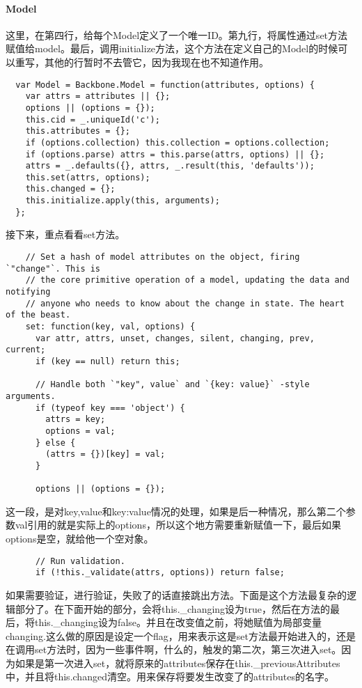 \documentclass[12pt, oneside, b5paper]{book}
\begin{document}
\begin{CJK}{UTF8}{gkai}
  \paragraph{Model}
  这里，在第四行，给每个Model定义了一个唯一ID。第九行，将属性通过set方法赋值给model。最后，调用initialize方法，这个方法在定义自己的Model的时候可以重写，其他的行暂时不去管它，因为我现在也不知道作用。
  \begin{lstlisting}
  var Model = Backbone.Model = function(attributes, options) {
    var attrs = attributes || {};
    options || (options = {});
    this.cid = _.uniqueId('c');
    this.attributes = {};
    if (options.collection) this.collection = options.collection;
    if (options.parse) attrs = this.parse(attrs, options) || {};
    attrs = _.defaults({}, attrs, _.result(this, 'defaults'));
    this.set(attrs, options);
    this.changed = {};
    this.initialize.apply(this, arguments);
  };
  \end{lstlisting}

  接下来，重点看看set方法。
  \begin{lstlisting}
    // Set a hash of model attributes on the object, firing `"change"`. This is
    // the core primitive operation of a model, updating the data and notifying
    // anyone who needs to know about the change in state. The heart of the beast.
    set: function(key, val, options) {
      var attr, attrs, unset, changes, silent, changing, prev, current;
      if (key == null) return this;

      // Handle both `"key", value` and `{key: value}` -style arguments.
      if (typeof key === 'object') {
        attrs = key;
        options = val;
      } else {
        (attrs = {})[key] = val;
      }

      options || (options = {});
  \end{lstlisting}
  这一段，是对key,value和{key:value}情况的处理，如果是后一种情况，那么第二个参数val引用的就是实际上的options，所以这个地方需要重新赋值一下，最后如果options是空，就给他一个空对象。

  \begin{lstlisting}
      // Run validation.
      if (!this._validate(attrs, options)) return false;
  \end{lstlisting}

  如果需要验证，进行验证，失败了的话直接跳出方法。下面是这个方法最复杂的逻辑部分了。在下面开始的部分，会将this.\_changing设为true，然后在方法的最后，将this.\_changing设为false。并且在改变值之前，将她赋值为局部变量changing.这么做的原因是设定一个flag，用来表示这是set方法最开始进入的，还是在调用set方法时，因为一些事件啊，什么的，触发的第二次，第三次进入set。因为如果是第一次进入set，就将原来的attributes保存在this.\_previousAttributes中，并且将this.changed清空。用来保存将要发生改变了的attributes的名字。


\end{CJK}
\end{document}
